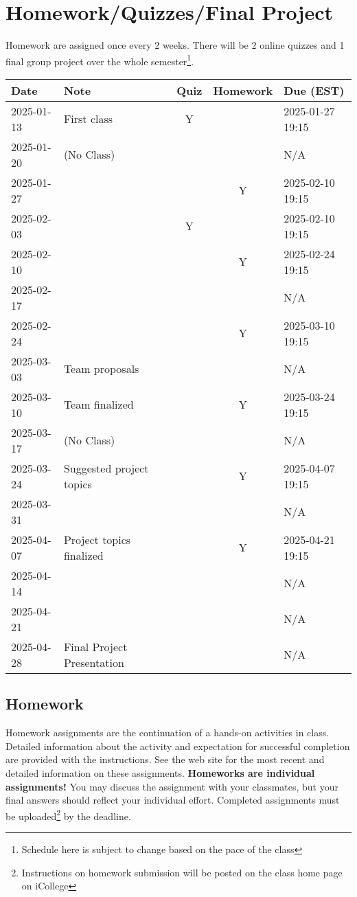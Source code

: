 \documentclass[a4paper, 12pt]{article}
\begin{document}
\section{Homework/Quizzes/Final Project}
Homework are assigned once every 2 weeks. There will be 2 online quizzes and 1 final group project over the whole semester\footnote{Schedule here is subject to change based on the pace of the class}.
\begin{center}
  \begin{tabular}{ l|l|c|c|l }
      \hline			
      Date & Note & Quiz & Homework & Due (EST)\\
      \hline
      2025-01-13 & First class & Y &  & 2025-01-27 19:15 \\
      2025-01-20 & (No Class) &  &  & N/A \\
      2025-01-27 &  &  & Y & 2025-02-10 19:15 \\
      2025-02-03 &  & Y &  & 2025-02-10 19:15 \\
      2025-02-10 &  &  & Y & 2025-02-24 19:15 \\
      2025-02-17 &  &  &  & N/A \\
      2025-02-24 &   &  & Y & 2025-03-10 19:15 \\
      2025-03-03 & Team proposals &  &  & N/A \\
      2025-03-10 & Team finalized &  & Y & 2025-03-24 19:15 \\
      2025-03-17 & (No Class) &  &  & N/A \\
      2025-03-24 & Suggested project topics &  & Y & 2025-04-07 19:15 \\
      2025-03-31 &  &  &  & N/A \\
      2025-04-07 & Project topics finalized &  & Y & 2025-04-21 19:15 \\
      2025-04-14 &  &  &  & N/A \\
      2025-04-21 &  &  &  & N/A \\
      2025-04-28 & Final Project Presentation &  &  & N/A \\
      \hline  
  \end{tabular}
\end{center}

\subsection{Homework}
Homework assignments are the continuation of a hands-on activities in class. Detailed information about the activity and expectation for successful completion are provided with the instructions. See the web site for the most recent and detailed information on these assignments. \textbf{Homeworks are individual assignments!} You may discuss the assignment with your classmates, but your ﬁnal answers should reﬂect your individual eﬀort. Completed assignments must be uploaded\footnote{Instructions on homework submission will be posted on the class home page on iCollege} by the deadline.
\end{document}
